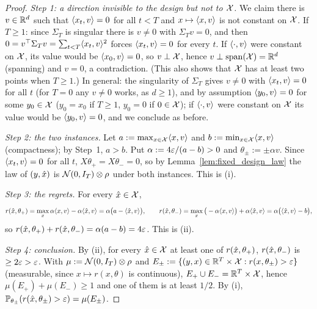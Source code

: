 \begin{proof}
\leanok
{}
\emph{Step 1: a direction invisible to the design but not to $\mathcal{X}$.} We claim there is
$v \in \mathbb{R}^d$ such that $\langle x_t, v \rangle = 0$ for all $t < T$ and $x \mapsto \langle x, v \rangle$ is not
constant on $\mathcal{X}$.
If $T \ge 1$: since $\Sigma_T$ is singular there is $v \ne 0$ with $\Sigma_T v = 0$, and then
$0 = v^\top\Sigma_T v = \sum_{t<T}\langle x_t, v \rangle^2$ forces $\langle x_t, v \rangle = 0$ for every $t$. If
$\langle \cdot, v \rangle$ were constant on $\mathcal{X}$, its value would be $\langle x_0, v \rangle = 0$, so
$v \perp \mathcal{X}$, hence $v \perp \operatorname{span}(\mathcal{X}) = \mathbb{R}^d$ (spanning) and $v = 0$, a contradiction. (This also
shows that $\mathcal{X}$ has at least two points when $T \ge 1$.)
In general: the singularity of $\Sigma_T$ gives $v \ne 0$ with $\langle x_t, v \rangle = 0$ for all $t$
(for $T = 0$ any $v \ne 0$ works, as $d \ge 1$), and by assumption $\langle y_0, v \rangle = 0$ for some
$y_0 \in \mathcal{X}$ ($y_0 = x_0$ if $T \ge 1$, $y_0 = 0$ if $0 \in \mathcal{X}$); if $\langle \cdot, v \rangle$ were constant
on $\mathcal{X}$ its value would be $\langle y_0, v \rangle = 0$, and we conclude as before.

\emph{Step 2: the two instances.} Let $a := \max_{x\in\mathcal{X}}\langle x, v \rangle$ and
$b := \min_{x\in\mathcal{X}}\langle x, v \rangle$ (compactness); by Step~1, $a > b$. Put
$\alpha := 4\varepsilon/(a-b) > 0$ and $\theta_\pm := \pm\alpha v$. Since $\langle x_t, v \rangle = 0$ for all
$t$, $X\theta_+ = X\theta_- = 0$, so by Lemma~\ref{lem:fixed_design_law} the law of
$(y,\hat{x})$ is $\mathcal{N}(0, I_T)\otimes\rho$ under both instances. This is (i).

\emph{Step 3: the regrets.} For every $\hat{x}\in\mathcal{X}$,
\[
  r(\hat{x},\theta_+) = \max_x \alpha\langle x, v \rangle - \alpha\langle \hat{x}, v \rangle = \alpha\big(a - \langle \hat{x}, v \rangle\big),
  \qquad
  r(\hat{x},\theta_-) = \max_x \big(-\alpha\langle x, v \rangle\big) + \alpha\langle \hat{x}, v \rangle = \alpha\big(\langle \hat{x}, v \rangle - b\big),
\]
so $r(\hat{x},\theta_+) + r(\hat{x},\theta_-) = \alpha(a-b) = 4\varepsilon$. This is (ii).

\emph{Step 4: conclusion.} By (ii), for every $\hat{x} \in \mathcal{X}$ at least one of
$r(\hat{x},\theta_+)$, $r(\hat{x},\theta_-)$ is $\ge 2\varepsilon > \varepsilon$. With $\mu := \mathcal{N}(0,I_T)\otimes\rho$
and $E_\pm := \{(y, x) \in \mathbb{R}^T\times\mathcal{X} : r(x,\theta_\pm) > \varepsilon\}$ (measurable, since
$x \mapsto r(x,\theta)$ is continuous), $E_+ \cup E_- = \mathbb{R}^T\times\mathcal{X}$, hence
$\mu(E_+) + \mu(E_-) \ge 1$ and one of them is at least $1/2$. By (i),
$\mathbb{P}_{\theta_\pm}(r(\hat{x},\theta_\pm) > \varepsilon) = \mu(E_\pm)$.
\end{proof}

